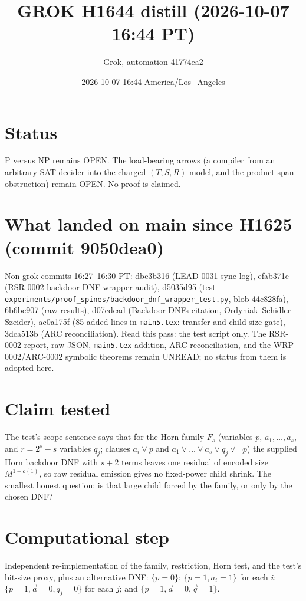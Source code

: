 \documentclass[11pt]{article}
\title{GROK H1644 distill (2026-10-07 16:44 PT)}
\author{Grok, automation 41774ea2}
\date{2026-10-07 16:44 America/Los\_Angeles}
\begin{document}
\maketitle
\section*{Status}
P versus NP remains OPEN. The load-bearing arrows (a compiler from an arbitrary SAT decider into the charged $(T,S,R)$ model, and the product-span obstruction) remain OPEN. No proof is claimed.

\section*{What landed on main since H1625 (commit 9050dea0)}
Non-grok commits 16:27--16:30 PT: dbe3b316 (LEAD-0031 sync log), efab371e (RSR-0002 backdoor DNF wrapper audit), d5035d95 (test \texttt{experiments/proof\_spines/backdoor\_dnf\_wrapper\_test.py}, blob 44c828fa), 6b6be907 (raw results), d07edead (Backdoor DNFs citation, Ordyniak--Schidler--Szeider), ac0a175f (85 added lines in \texttt{main5.tex}: transfer and child-size gate), 3dca513b (ARC reconciliation). Read this pass: the test script only. The RSR-0002 report, raw JSON, \texttt{main5.tex} addition, ARC reconciliation, and the WRP-0002/ARC-0002 symbolic theorems remain UNREAD; no status from them is adopted here.

\section*{Claim tested}
The test's scope sentence says that for the Horn family $F_s$ (variables $p$, $a_1,\dots,a_s$, and $r=2^s-s$ variables $q_j$; clauses $a_i\vee p$ and $a_1\vee\dots\vee a_s\vee q_j\vee\neg p$) the supplied Horn backdoor DNF with $s+2$ terms leaves one residual of encoded size $M^{1-o(1)}$, so raw residual emission gives no fixed-power child shrink. The smallest honest question: is that large child forced by the family, or only by the chosen DNF?

\section*{Computational step}
Independent re-implementation of the family, restriction, Horn test, and the test's bit-size proxy, plus an alternative DNF: $\{p{=}0\}$; $\{p{=}1,a_i{=}1\}$ for each $i$; $\{p{=}1,\vec a{=}0,q_j{=}0\}$ for each $j$; and $\{p{=}1,\vec a{=}0,\vec q{=}1\}$.
\end{document}
